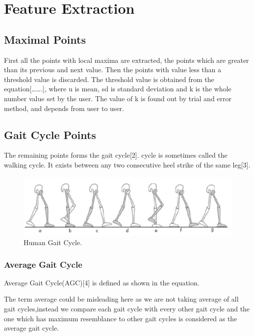\documentclass[a4paper]{report}
\begin{document}
\newpage
\chapter{Feature Extraction}
\section{Maximal Points}
First all the points with local maxima are extracted, the points which are greater than its previous and next value. Then the points with value less than a threshold value is discarded. The threshold value is obtained from the equation[…….], where u is mean, sd is standard deviation and k is the whole number value set by the user. The value of k is found out by trial and error method, and depends from user to user.

\section{Gait Cycle Points} 
The remaining points forms the gait cycle[2]. cycle is sometimes called the walking cycle. It exists  between any two consecutive heel strike of the same leg[3].

\begin{figure}
\includegraphics[scale=0.73]{pictures/gaitcycle.png}
\caption{Human Gait Cycle.}
\end{figure}

\subsection{Average Gait Cycle} 
Average Gait Cycle(AGC)[4] is defined as shown in the equation.


The term average could be misleading here as we are not taking average of all gait cycles,instead we compare each gait cycle with every other gait cycle and the one which has maximum resemblance to other gait cycles is considered as the average gait cycle.
\end{document}
